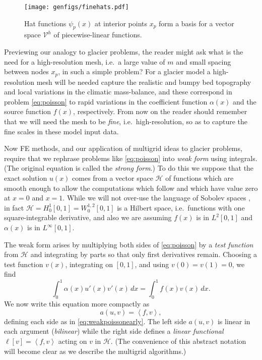 \documentclass[letterpaper,final,12pt,reqno]{amsart}
\theoremstyle{claim}
\newcommand{\ip}[2]{\left<#1,#2\right>}
\numberwithin{equation}{section}
\numberwithin{figure}{section}
\numberwithin{table}{section}
\begin{document}
\begin{figure}
\texttt{[image: genfigs/finehats.pdf]}
\caption{Hat functions $\psi_p(x)$ at interior points $x_p$ form a basis for a vector space $\mathcal{V}^h$ of piecewise-linear functions.}
\label{fig:finehats}
\end{figure}

Previewing our analogy to glacier problems, the reader might ask what is the need for a high-resolution mesh, i.e.~a large value of $m$ and small spacing between nodes $x_p$, in such a simple problem?  For a glacier model a high-resolution mesh will be needed capture the realistic and bumpy bed topography and local variations in the climatic mass-balance, and these correspond in problem \eqref{eq:poisson} to rapid variations in the coefficient function $\alpha(x)$ and the source function $f(x)$, respectively.  From now on the reader should remember that we will need the mesh to be \emph{fine}, i.e.~high-resolution, so as to capture the fine scales in these model input data.

Now FE methods, and our application of multigrid ideas to glacier problems, require that we rephrase problems like \eqref{eq:poisson} into \emph{weak form} using integrals.  (The original equation is called the \emph{strong form}.)  To do this we suppose that the exact solution $u(x)$ comes from a vector space $\mathcal{H}$ of functions which are smooth enough to allow the computations which follow and which have value zero at $x=0$ and $x=1$.  While we will not over-use the language of Sobolev spaces \cite[for example]{Evans2010}, in fact $\mathcal{H}=H_0^1[0,1]=W_0^{1,2}[0,1]$ is a Hilbert space, i.e.~functions with one square-integrable derivative, and also we are assuming $f(x)$ is in $L^2[0,1]$ and $\alpha(x)$ is in $L^\infty[0,1]$.

The weak form arises by multiplying both sides of \eqref{eq:poisson} by a \emph{test function} from $\mathcal{H}$ and integrating by parts so that only first derivatives remain.  Choosing a test function $v(x)$, integrating on $[0,1]$, and using $v(0)=v(1)=0$, we find
\begin{equation}
\int_0^1 \alpha(x) u'(x) v'(x)\,dx = \int_0^1 f(x) v(x)\, dx.  \label{eq:weakpoissonearly}
\end{equation}
We now write this equation more compactly as
\begin{equation}
  a(u,v) = \ip{f}{v}, \label{eq:weakpoisson}
\end{equation}
defining each side as in \eqref{eq:weakpoissonearly}.  The left side $a(u,v)$ is linear in each argument (\emph{bilinear}) while the right side defines a \emph{linear functional} $\ell[v] = \ip{f}{v}$ acting on $v$ in $\mathcal{H}$.  (The convenience of this abstract notation will become clear as we describe the multigrid algorithms.)
\end{document}
